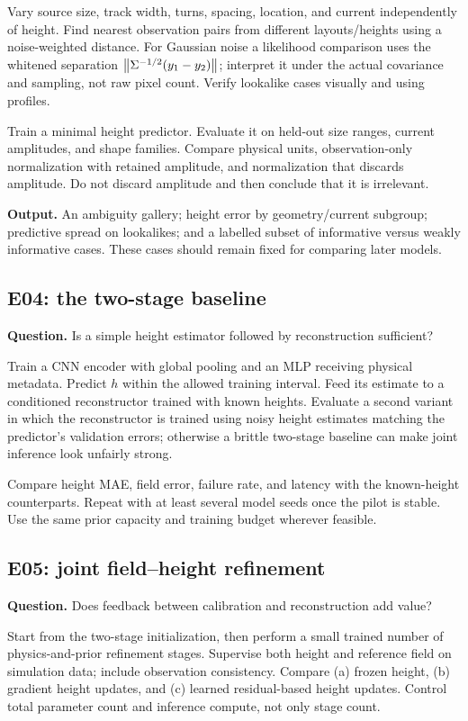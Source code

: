 Vary source size, track width, turns, spacing, location, and current independently of height. Find nearest observation pairs from different layouts/heights using a noise-weighted distance. For Gaussian noise a likelihood comparison uses the whitened separation $\left\lVert\Sigma^{-1/2}(y_1-y_2)\right\rVert$; interpret it under the actual covariance and sampling, not raw pixel count. Verify lookalike cases visually and using profiles.

Train a minimal height predictor. Evaluate it on held-out size ranges, current amplitudes, and shape families. Compare physical units, observation-only normalization with retained amplitude, and normalization that discards amplitude. Do not discard amplitude and then conclude that it is irrelevant.

\textbf{Output.} An ambiguity gallery; height error by geometry/current subgroup; predictive spread on lookalikes; and a labelled subset of informative versus weakly informative cases. These cases should remain fixed for comparing later models.

\subsection{E04: the two-stage baseline}
\textbf{Question.} Is a simple height estimator followed by reconstruction sufficient?

Train a CNN encoder with global pooling and an MLP receiving physical metadata. Predict $h$ within the allowed training interval. Feed its estimate to a conditioned reconstructor trained with known heights. Evaluate a second variant in which the reconstructor is trained using noisy height estimates matching the predictor's validation errors; otherwise a brittle two-stage baseline can make joint inference look unfairly strong.

Compare height MAE, field error, failure rate, and latency with the known-height counterparts. Repeat with at least several model seeds once the pilot is stable. Use the same prior capacity and training budget wherever feasible.

\subsection{E05: joint field--height refinement}
\textbf{Question.} Does feedback between calibration and reconstruction add value?

Start from the two-stage initialization, then perform a small trained number of physics-and-prior refinement stages. Supervise both height and reference field on simulation data; include observation consistency. Compare (a) frozen height, (b) gradient height updates, and (c) learned residual-based height updates. Control total parameter count and inference compute, not only stage count.

